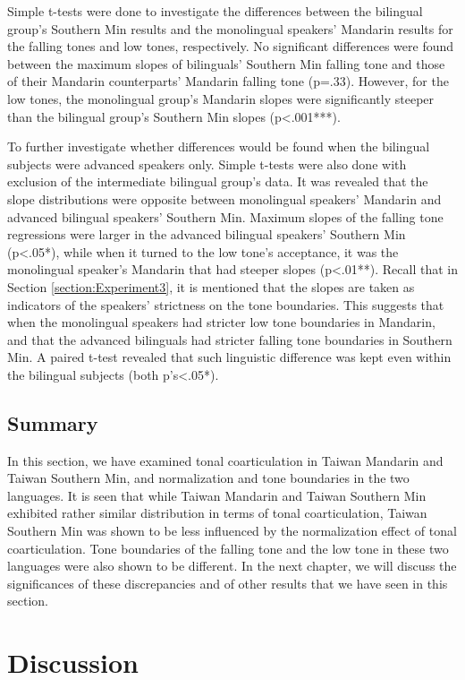 \documentclass[12pt]{report}
\begin{document}
\begin{CJK}{UTF8}{bsmi}
Simple t-tests were done to investigate the differences between the bilingual group's Southern Min results and the monolingual speakers' Mandarin results for the falling tones and low tones, respectively. No significant differences were found between the maximum slopes of bilinguals' Southern Min falling tone and those of their Mandarin counterparts' Mandarin falling tone (p=.33). However, for the low tones, the monolingual group's Mandarin slopes were significantly steeper than the bilingual group's Southern Min slopes (p<.001***).

To further investigate whether differences would be found when the bilingual subjects were advanced speakers only. Simple t-tests were also done with exclusion of the intermediate bilingual group's data. It was revealed that the slope distributions were opposite between monolingual speakers' Mandarin and advanced bilingual speakers' Southern Min. Maximum slopes of the falling tone regressions were larger in the advanced bilingual speakers' Southern Min (p<.05*), while when it turned to the low tone's acceptance, it was the monolingual speaker's Mandarin that had steeper slopes (p<.01**). Recall that in Section \ref{section:Experiment3}, it is mentioned that the slopes are taken as indicators of the speakers' strictness on the tone boundaries. This suggests that when the monolingual speakers had stricter low tone boundaries in Mandarin, and that the advanced bilinguals had stricter falling tone boundaries in Southern Min. A paired t-test revealed that such linguistic difference was kept even within the bilingual subjects (both p's<.05*).

\section{Summary}
In this section, we have examined tonal coarticulation in Taiwan Mandarin and Taiwan Southern Min, and normalization and tone boundaries in the two languages. It is seen that while Taiwan Mandarin and Taiwan Southern Min exhibited rather similar distribution in terms of tonal coarticulation, Taiwan Southern Min was shown to be less influenced by the normalization effect of tonal coarticulation. Tone boundaries of the falling tone and the low tone in these two languages were also shown to be different. In the next chapter, we will discuss the significances of these discrepancies and of other results that we have seen in this section.

\pagebreak
\chapter{Discussion}


\end{CJK}
\end{document}
